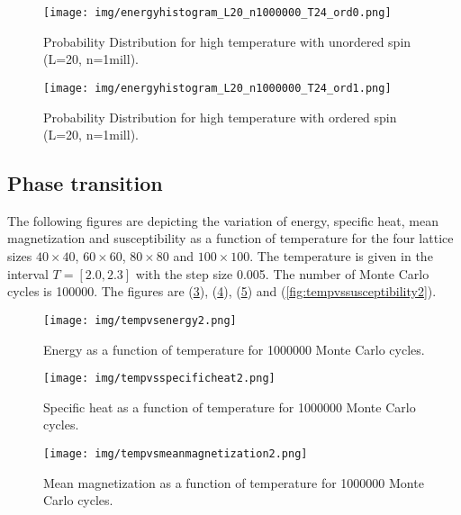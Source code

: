 \documentclass{article}
\begin{document}
  \begin{figure}[ht]
      \centering
      \texttt{[image: img/energyhistogram\_L20\_n1000000\_T24\_ord0.png]}
      \caption{Probability Distribution for high temperature with unordered spin (L=20, n=1mill).}
      \label{fig:prob-highT-ord0}
    \end{figure}

  \begin{figure}[ht]
      \centering
      \texttt{[image: img/energyhistogram\_L20\_n1000000\_T24\_ord1.png]}
      \caption{Probability Distribution for high temperature with ordered spin (L=20, n=1mill).}
      \label{fig:prob-highT-ord1}
    \end{figure}


\subsection{Phase transition} \label{sec:phasetransition}

The following figures are depicting the variation of energy, specific heat, mean magnetization and susceptibility as a function of temperature for the four lattice sizes $40 \times 40$, $60 \times 60$, $80 \times 80$ and $100 \times 100$. The temperature is given in the interval $T = [2.0 , 2.3]$ with the step size 0.005. The number of Monte Carlo cycles is 100000. The figures are
(\ref{fig:tempvsenergy2}), (\ref{fig:tempvsspecitifheat2}), (\ref{fig:tempvsmeanmagnetization2}) and (\ref{fig:tempvssusceptibility2}).


  \begin{figure}[ht]
      \centering
      \texttt{[image: img/tempvsenergy2.png]}
      \caption{Energy as a function of temperature for 1000000 Monte Carlo cycles.}
      \label{fig:tempvsenergy2}
    \end{figure}

  \begin{figure}[ht]
      \centering
      \texttt{[image: img/tempvsspecificheat2.png]}
      \caption{Specific heat as a function of temperature for 1000000 Monte Carlo cycles.}
      \label{fig:tempvsspecitifheat2}
    \end{figure}

  \begin{figure}[ht]
      \centering
      \texttt{[image: img/tempvsmeanmagnetization2.png]}
      \caption{Mean magnetization as a function of temperature for 1000000 Monte Carlo cycles.}
      \label{fig:tempvsmeanmagnetization2}
    \end{figure}
\end{document}
